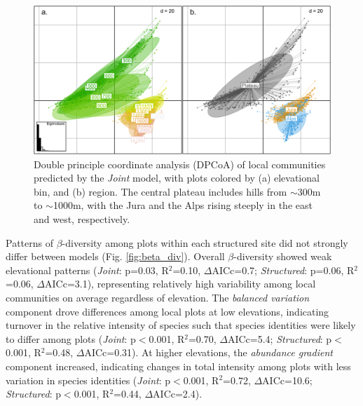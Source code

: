 \documentclass[preprint,review,times,12pt,3p]{elsarticle}
\begin{document}
\begin{figure}
	\centering\includegraphics[width=5in]{../../../ms/1_Ecography/1/figs/DPCoA_Joint.png}
	\caption{\label{fig:dpcoa_joint} Double principle coordinate analysis (DPCoA) of local communities predicted by the \emph{Joint} model, with plots colored by (a) elevational bin, and (b) region. The central plateau includes hills from $\sim$300m to $\sim$1000m, with the Jura and the Alps rising steeply in the east and west, respectively. }
\end{figure}

Patterns of $\beta$-diversity among plots within each structured site did not strongly differ between models (Fig. \ref{fig:beta_div}). Overall $\beta$-diversity showed weak elevational patterns (\emph{Joint}: p=0.03, R$^2$=0.10, $\Delta$AICc=0.7; \emph{Structured}: p=0.06, R$^2$=0.06, $\Delta$AICc=3.1), representing relatively high variability among local communities on average regardless of elevation. The \emph{balanced variation} component drove differences among local plots at low elevations, indicating turnover in the relative intensity of species such that species identities were likely to differ among plots (\emph{Joint}: p$<$0.001, R$^2$=0.70, $\Delta$AICc=5.4; \emph{Structured}: p$<$0.001, R$^2$=0.48, $\Delta$AICc=0.31). At higher elevations, the \emph{abundance gradient} component increased, indicating changes in total intensity among plots with less variation in species identities (\emph{Joint}: p$<$0.001, R$^2$=0.72, $\Delta$AICc=10.6; \emph{Structured}: p$<$0.001, R$^2$=0.44, $\Delta$AICc=2.4). 
\end{document}
